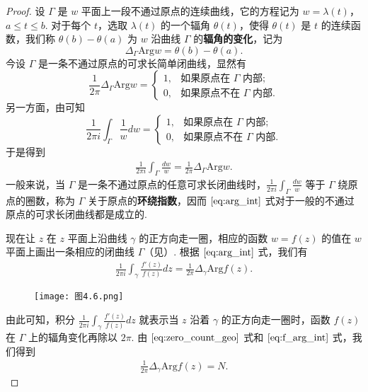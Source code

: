 \documentclass[../../main.tex]{subfiles}
\begin{document}
\begin{proof}
 设 \( \Gamma \) 是 \( w \) 平面上一段不通过原点的连续曲线，它的方程记为 \( w = \lambda(t) \)，\( a \leq t \leq b \). 对于每个 \( t \)，选取 \( \lambda(t) \) 的一个辐角 \( \theta(t) \)，使得 \( \theta(t) \) 是 \( t \) 的连续函数，我们称 \( \theta(b) - \theta(a) \) 为 \( w \) 沿曲线 \( \Gamma \) 的\textbf{辐角的变化}，记为
\[
\Delta_{\Gamma} \text{Arg} w = \theta(b) - \theta(a).
\]
今设 \( \Gamma \) 是一条不通过原点的可求长简单闭曲线，显然有
\[
\frac{1}{2\pi} \Delta_{\Gamma} \text{Arg} w = 
\begin{cases} 
1, & \text{如果原点在 } \Gamma \text{ 内部}; \\
0, & \text{如果原点不在 } \Gamma \text{ 内部}.
\end{cases}
\]
另一方面，由可知
\[
\frac{1}{2\pi i} \int_{\Gamma} \frac{1}{w} dw = 
\begin{cases} 
1, & \text{如果原点在 } \Gamma \text{ 内部}; \\
0, & \text{如果原点不在 } \Gamma \text{ 内部}.
\end{cases}
\]
于是得到
\begin{align}
\frac{1}{2\pi i} \int_{\Gamma} \frac{dw}{w} = \frac{1}{2\pi} \Delta_{\Gamma} \text{Arg} w. \label{eq:arg_int}
\end{align}
一般来说，当 \( \Gamma \) 是一条不通过原点的任意可求长闭曲线时，\( \frac{1}{2\pi i} \int_{\Gamma} \frac{dw}{w} \) 等于 \( \Gamma \) 绕原点的圈数，称为 \( \Gamma \) 关于原点的\textbf{环绕指数}，因而 \(\eqref{eq:arg_int}\) 式对于一般的不通过原点的可求长闭曲线都是成立的.

现在让 \( z \) 在 \( z \) 平面上沿曲线 \( \gamma \) 的正方向走一圈，相应的函数 \( w = f(z) \) 的值在 \( w \) 平面上画出一条相应的闭曲线 \( \Gamma \)（见）. 根据 \(\eqref{eq:arg_int}\) 式，我们有
\begin{align}
\frac{1}{2\pi i} \int_{\gamma} \frac{f'(z)}{f(z)} dz = \frac{1}{2\pi} \Delta_{\gamma} \text{Arg} f(z). \label{eq:f_arg_int}
\end{align}
\begin{figure}[H]
\centering
\texttt{[image: 图4.6.png]}
\caption{}
\label{figure:图4.6}
\end{figure}
由此可知，积分 \( \frac{1}{2\pi i} \int_{\gamma} \frac{f'(z)}{f(z)} dz \) 就表示当 \( z \) 沿着 \( \gamma \) 的正方向走一圈时，函数 \( f(z) \) 在 \( \Gamma \) 上的辐角变化再除以 \( 2\pi \). 由 \(\eqref{eq:zero_count_geo}\) 式和 \(\eqref{eq:f_arg_int}\) 式，我们得到
\begin{align}
\frac{1}{2\pi} \Delta_{\gamma} \text{Arg} f(z) = N. \label{eq:arg_zero}
\end{align}
\end{proof}
\end{document}
